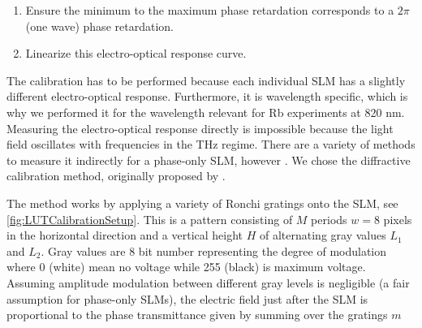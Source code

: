 \begin{enumerate}
    \itemsep=0pt
    
    \item Ensure the minimum to the maximum phase retardation corresponds to a $2\pi$ (one wave) phase retardation.
    
    \item Linearize this electro-optical response curve. 
\end{enumerate}
The calibration has to be performed because each individual SLM has a slightly different electro-optical response. 
Furthermore, it is wavelength specific, which is why we performed it for the wavelength relevant for Rb experiments at 820 nm. 
Measuring the electro-optical response directly is impossible because the light field oscillates with frequencies in the THz regime.
There are a variety of methods to measure it indirectly for a phase-only \ac{SLM}, however \cite{Li2019}.
We chose the diffractive calibration method, originally proposed by \cite{Zhang1994}.

The method works by applying a variety of Ronchi gratings onto the SLM, see \cref{fig:LUTCalibrationSetup}.
This is a pattern consisting of $M$ periods $w=8$ pixels in the horizontal direction and a vertical height $H$ of alternating gray values $L_1$ and $L_2$.
Gray values are 8 bit number representing the degree of modulation where 0 (white) mean no voltage while 255 (black) is maximum voltage. 
Assuming amplitude modulation between different gray levels is negligible (a fair assumption for phase-only SLMs), the electric field just after the SLM is proportional to the phase transmittance given by summing over the gratings $m$ \cite{Zhang1994}

